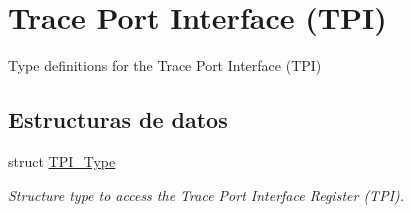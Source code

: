 \hypertarget{group___c_m_s_i_s___t_p_i}{}\section{Trace Port Interface (T\+PI)}
\label{group___c_m_s_i_s___t_p_i}


Type definitions for the Trace Port Interface (T\+PI)  


\subsection*{Estructuras de datos}
\begin{DoxyCompactItemize}
\item 
struct \hyperlink{struct_t_p_i___type}{T\+P\+I\+\_\+\+Type}
\begin{DoxyCompactList}\small\item\em Structure type to access the Trace Port Interface Register (T\+PI). \end{DoxyCompactList}\end{DoxyCompactItemize}
